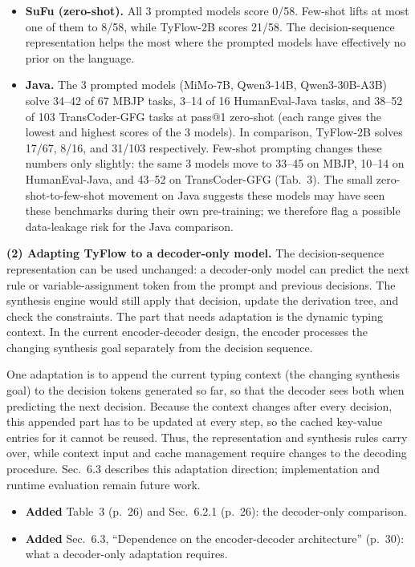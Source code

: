 \documentclass[11pt,a4paper]{article}
\newcommand{\changesmade}[1]{\par\medskip\needspace{4\baselineskip}\noindent{\bfseries\color{accent}Changes made.}%
  \par\nopagebreak\smallskip#1\par}
\begin{document}
\begin{itemize}[leftmargin=1.4em]
  \item \textbf{SuFu (zero-shot).} All 3 prompted models score 0/58. Few-shot lifts at most one of them to 8/58, while TyFlow-2B scores 21/58. The decision-sequence representation helps the most where the prompted models have effectively no prior on the language.
  \item \textbf{Java.} The 3 prompted models (MiMo-7B, Qwen3-14B, Qwen3-30B-A3B) solve 34--42 of 67 MBJP tasks, 3--14 of 16 HumanEval-Java tasks, and 38--52 of 103 TransCoder-GFG tasks at pass@1 zero-shot (each range gives the lowest and highest scores of the 3 models). In comparison, TyFlow-2B solves 17/67, 8/16, and 31/103 respectively. 
  Few-shot prompting changes these numbers only slightly: the same 3 models move to 33--45 on MBJP, 10--14 on HumanEval-Java, and 43--52 on TransCoder-GFG (Tab.~3). The small zero-shot-to-few-shot movement on Java suggests these models may have seen these benchmarks during their own pre-training; we therefore flag a possible data-leakage risk for the Java comparison.
\end{itemize}

\textbf{(2) Adapting TyFlow to a decoder-only model.} The decision-sequence representation can be used unchanged: a decoder-only model can predict the next rule or variable-assignment token from the prompt and previous decisions. The synthesis engine would still apply that decision, update the derivation tree, and check the constraints. The part that needs adaptation is the dynamic typing context. In the current encoder-decoder design, the encoder processes the changing synthesis goal separately from the decision sequence.

One adaptation is to append the current typing context (the changing synthesis goal) to the decision tokens generated so far, so that the decoder sees both when predicting the next decision. Because the context changes after every decision, this appended part has to be updated at every step, so the cached key-value entries for it cannot be reused. Thus, the representation and synthesis rules carry over, while context input and cache management require changes to the decoding procedure. Sec.~6.3 describes this adaptation direction; implementation and runtime evaluation remain future work.

\changesmade{\begin{itemize}[leftmargin=1.2em,itemsep=1pt,topsep=2pt]
  \item \textbf{Added} Table~3 (p.~26) and Sec.~6.2.1 (p.~26): the decoder-only comparison.
  \item \textbf{Added} Sec.~6.3, ``Dependence on the encoder-decoder architecture'' (p.~30): what a decoder-only adaptation requires.
\end{itemize}}
\end{document}
